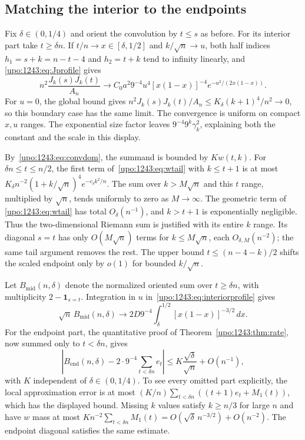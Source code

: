 \documentclass[11pt,letterpaper]{article}
\theoremstyle{remark}\newtheorem{remark}[theorem]{Remark}
\numberwithin{equation}{section}
\begin{document}
\subsection{Matching the interior to the endpoints}
Fix $\delta\in(0,1/4)$ and orient the convolution by $t\le s$ as before.
For its interior part take $t\ge\delta n$.
If $t/n\to x\in[\delta,1/2]$ and $k/\sqrt n\to u$, both half indices
$h_1=s+k=n-t-4$ and $h_2=t+k$ tend to infinity linearly, and
\eqref{upo:1243:eq:Jprofile} gives
\begin{equation}\label{upo:1243:eq:interiorprofile}
 n^2\frac{J_k(s)J_k(t)}{A_n}
 \longrightarrow C_0a^2 9^{-4}u^4[x(1-x)]^{-4}
 e^{-u^2/(2x(1-x))}.
\end{equation}
For $u=0$, the global bound gives
$n^2J_k(s)J_k(t)/A_n\le K_\delta(k+1)^4/n^2\to0$,
so this boundary case has the same limit. The convergence is uniform on
compact $x,u$ ranges. The exponential size
factor leaves $9^{-4}9^k\gamma_k^2$, explaining both the constant and
the scale in this display.

By~\eqref{upo:1243:eq:convdom}, the summand is bounded by $Kw(t,k)$.
For $\delta n\le t\le n/2$, the first term of~\eqref{upo:1243:eq:wtail} with
$k\le t+1$ is at most
$K_\delta n^{-2}(1+k/\sqrt n)^4e^{-c_\delta k^2/n}$.
The sum over $k>M\sqrt n$ and this $t$ range, multiplied by $\sqrt n$,
tends uniformly to zero as $M\to\infty$. The geometric term of
\eqref{upo:1243:eq:wtail} has total $O_\delta(n^{-1})$, and $k>t+1$ is
exponentially negligible. Thus the two-dimensional Riemann sum is
justified with its entire $k$ range. Its diagonal $s=t$ has only
$O(M\sqrt n)$ terms for $k\le M\sqrt n$, each $O_{\delta,M}(n^{-2})$;
the same tail argument removes the rest. The upper bound
$t\le(n-4-k)/2$ shifts the scaled endpoint only by $o(1)$ for bounded
$k/\sqrt n$.

Let $B_{\mathrm{mid}}(n,\delta)$ denote the normalized oriented sum over
$t\ge\delta n$, with multiplicity $2-\mathbf1_{s=t}$.
Integration in $u$ in~\eqref{upo:1243:eq:interiorprofile} gives
\begin{equation}\label{upo:1243:eq:midlimit}
 \sqrt n\,B_{\mathrm{mid}}(n,\delta)
 \longrightarrow 2D9^{-4}
       \int_\delta^{1/2}[x(1-x)]^{-3/2}\,dx.
\end{equation}
For the endpoint part, the quantitative proof of Theorem~\ref{upo:1243:thm:rate},
now summed only to $t<\delta n$, gives
\begin{equation}\label{upo:1243:eq:endmatch}
 \left|B_{\mathrm{end}}(n,\delta)
       -2\cdot9^{-4}\sum_{t<\delta n}e_t\right|
 \le K\frac{\sqrt\delta}{\sqrt n}+O(n^{-1}),
\end{equation}
with $K$ independent of $\delta\in(0,1/4)$.
To see every omitted part explicitly, the local approximation error is
at most
$(K/n)\sum_{t<\delta n}((t+1)e_t+M_1(t))$,
which has the displayed bound. Missing $k$ values satisfy $k\ge n/3$
for large $n$ and have $w$ mass at most
$Kn^{-2}\sum_{t<\delta n}M_1(t)
=O(\sqrt\delta\,n^{-3/2})+O(n^{-2})$.
The endpoint diagonal satisfies the same estimate.
\end{document}
